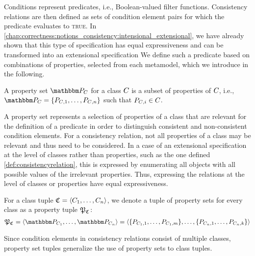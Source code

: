 Conditions represent predicates, i.e., Boolean-valued filter functions.
Consistency relations are then defined as sets of condition element pairs for which the predicate evaluates to \textsc{true}.
In \autoref{chap:correctness:notions_consistency:intensional_extensional}, we have already shown that this type of specification has equal expressiveness and can be transformed into an extensional specification
We define such a predicate based on combinations of properties, selected from each metamodel, which we introduce in the following.

\begin{definition}
A property set $\propertyset{P}{\class{C}{}}$ for a class $\class{C}{}$ is a subset of properties of $\class{C}{}$, i.e., $\propertyset{P}{\class{C}{}} = \setted{P_{\class{C}{}, 1}, \dots, P_{\class{C}{}, n}}$ such that $P_{\class{C}{}, i} \in \class{C}{}$.
\end{definition}

A property set represents a selection of properties of a class that are relevant for the definition of a predicate in order to distinguish consistent and non-consistent condition elements. For a consistency relation, not all properties of a class may be relevant and thus need to be considered. In a case of an extensional specification at the level of classes rather than properties, such as the one defined \autoref{def:consistencyrelation}, this is expressed by enumerating all objects with all possible values of the irrelevant properties. Thus, expressing the relations at the level of classes or properties have equal expressiveness.

\begin{definition}
For a class tuple $\classtuple{C}{} = \tupled{\class{C}{1}, \dots, \class{C}{n}}$, we denote a tuple of property sets for every class as a property tuple $\propertysettuple{P}{\classtuple{C}{}}$:
\begin{align*}
    \propertysettuple{P}{\classtuple{C}{}} = \tupled{\propertyset{P}{\class{C}{1}}, \dots, \propertyset{P}{\class{C}{n}}} = \tupled{\setted{P_{\class{C}{1}, 1}, \dots, P_{\class{C}{1}, m}}, \dots, \setted{P_{\class{C}{n}, 1}, \dots, P_{\class{C}{n}, k}}}
\end{align*}
\end{definition}

Since condition elements in consistency relations consist of multiple classes, property set tuples generalize the use of property sets to class tuples.

